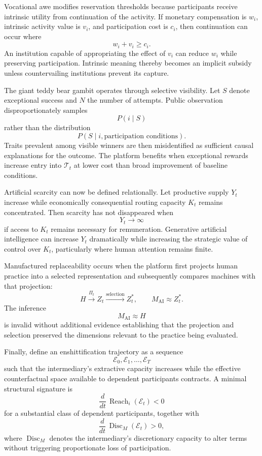 \documentclass[11pt]{article}
\begin{document}
Vocational awe modifies reservation thresholds because participants receive intrinsic utility from continuation of the activity. If monetary compensation is \(w_i\), intrinsic activity value is \(v_i\), and participation cost is \(c_i\), then continuation can occur where
\[
w_i+v_i\geq c_i.
\]
An institution capable of appropriating the effect of \(v_i\) can reduce \(w_i\) while preserving participation. Intrinsic meaning thereby becomes an implicit subsidy unless countervailing institutions prevent its capture.

The giant teddy bear gambit operates through selective visibility. Let \(S\) denote exceptional success and \(N\) the number of attempts. Public observation disproportionately samples
\[
P(i\mid S)
\]
rather than the distribution
\[
P(S\mid i,\text{participation conditions}).
\]
Traits prevalent among visible winners are then misidentified as sufficient causal explanations for the outcome. The platform benefits when exceptional rewards increase entry into \(\mathcal{T}_t\) at lower cost than broad improvement of baseline conditions.

Artificial scarcity can now be defined relationally. Let productive supply \(Y_t\) increase while economically consequential routing capacity \(K_t\) remains concentrated. Then scarcity has not disappeared when
\[
Y_t\rightarrow\infty
\]
if access to \(K_t\) remains necessary for remuneration. Generative artificial intelligence can increase \(Y_t\) dramatically while increasing the strategic value of control over \(K_t\), particularly where human attention remains finite.

Manufactured replaceability occurs when the platform first projects human practice into a selected representation and subsequently compares machines with that projection:
\[
H
\xrightarrow{\Pi_t}
Z_t
\xrightarrow{\text{selection}}
Z_t^{*},
\qquad
M_{\mathrm{AI}}
\approx
Z_t^{*}.
\]
The inference
\[
M_{\mathrm{AI}}\approx H
\]
is invalid without additional evidence establishing that the projection and selection preserved the dimensions relevant to the practice being evaluated.

Finally, define an enshittification trajectory as a sequence
\[
\mathcal{E}_0,
\mathcal{E}_1,
\ldots,
\mathcal{E}_T
\]
such that the intermediary's extractive capacity increases while the effective counterfactual space available to dependent participants contracts. A minimal structural signature is
\[
\frac{d}{dt}\,
\operatorname{Reach}_i(\mathcal{E}_t)<0
\]
for a substantial class of dependent participants, together with
\[
\frac{d}{dt}\,
\operatorname{Disc}_M(\mathcal{E}_t)>0,
\]
where \(\operatorname{Disc}_M\) denotes the intermediary's discretionary capacity to alter terms without triggering proportionate loss of participation.
\end{document}
